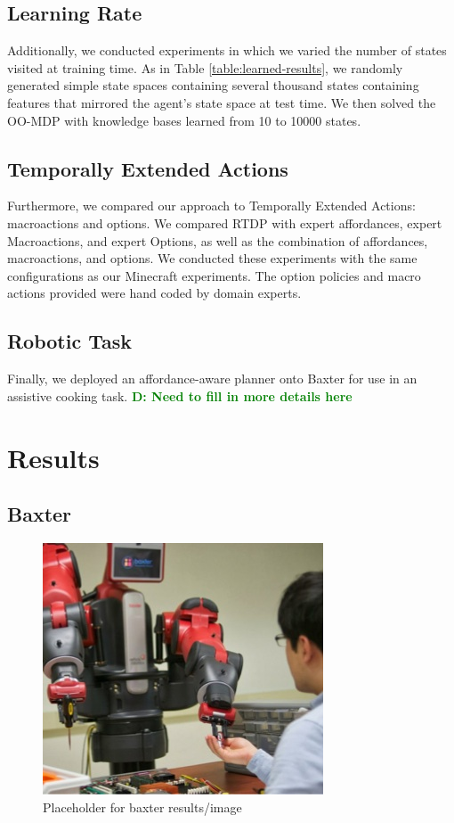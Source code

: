 \documentclass[conference]{IEEEtran}
\newcommand{\dnote}[1]{\textcolor{Green}{\textbf{D: #1}}}
\begin{document}
\subsection{Learning Rate}
Additionally, we conducted experiments in which we varied the number of states visited at training time. 
As in Table \ref{table:learned-results}, we randomly generated simple state spaces
containing several thousand states containing features that mirrored the agent's state
space at test time. We then solved the OO-MDP with knowledge bases learned from 
10 to 10000 states.

\subsection{Temporally Extended Actions}
Furthermore, we compared our approach to Temporally Extended Actions: 
macroactions and options. We compared RTDP with expert affordances, 
expert Macroactions, and expert Options, as well as the combination of 
affordances, macroactions, and options. We conducted these experiments 
with the same configurations as our Minecraft experiments. The option policies
and macro actions provided were hand coded by domain experts.

\subsection{Robotic Task}
Finally, we deployed an affordance-aware planner onto Baxter for use
in an assistive cooking task. \dnote{Need to fill in more details here}

\section{Results}
\label{sec:results}

\subsection{Baxter}

\begin{figure}[H]
\centering
\includegraphics[scale=0.195]{figures/baxter_temp.jpg}%
  \caption{Placeholder for baxter results/image}
  \label{fig:baxter_results}
\end{figure}
\end{document}

